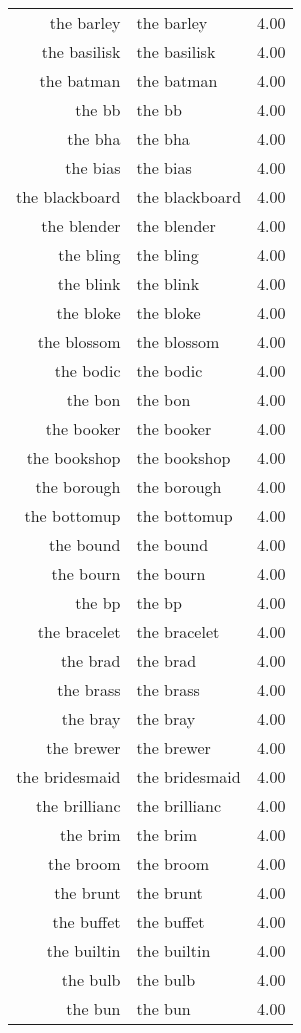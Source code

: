 \begin{table}[ht]
\begin{tabular}{rlr}
  the barley & the barley & 4.00 \\ 
  the basilisk & the basilisk & 4.00 \\ 
  the batman & the batman & 4.00 \\ 
  the bb & the bb & 4.00 \\ 
  the bha & the bha & 4.00 \\ 
  the bias & the bias & 4.00 \\ 
  the blackboard & the blackboard & 4.00 \\ 
  the blender & the blender & 4.00 \\ 
  the bling & the bling & 4.00 \\ 
  the blink & the blink & 4.00 \\ 
  the bloke & the bloke & 4.00 \\ 
  the blossom & the blossom & 4.00 \\ 
  the bodic & the bodic & 4.00 \\ 
  the bon & the bon & 4.00 \\ 
  the booker & the booker & 4.00 \\ 
  the bookshop & the bookshop & 4.00 \\ 
  the borough & the borough & 4.00 \\ 
  the bottomup & the bottomup & 4.00 \\ 
  the bound & the bound & 4.00 \\ 
  the bourn & the bourn & 4.00 \\ 
  the bp & the bp & 4.00 \\ 
  the bracelet & the bracelet & 4.00 \\ 
  the brad & the brad & 4.00 \\ 
  the brass & the brass & 4.00 \\ 
  the bray & the bray & 4.00 \\ 
  the brewer & the brewer & 4.00 \\ 
  the bridesmaid & the bridesmaid & 4.00 \\ 
  the brillianc & the brillianc & 4.00 \\ 
  the brim & the brim & 4.00 \\ 
  the broom & the broom & 4.00 \\ 
  the brunt & the brunt & 4.00 \\ 
  the buffet & the buffet & 4.00 \\ 
  the builtin & the builtin & 4.00 \\ 
  the bulb & the bulb & 4.00 \\ 
  the bun & the bun & 4.00 \\ 

\end{tabular}
\end{table}
